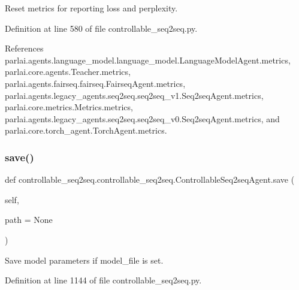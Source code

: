 \begin{DoxyVerb}Reset metrics for reporting loss and perplexity.\end{DoxyVerb}
 

Definition at line 580 of file controllable\+\_\+seq2seq.\+py.



References parlai.\+agents.\+language\+\_\+model.\+language\+\_\+model.\+Language\+Model\+Agent.\+metrics, parlai.\+core.\+agents.\+Teacher.\+metrics, parlai.\+agents.\+fairseq.\+fairseq.\+Fairseq\+Agent.\+metrics, parlai.\+agents.\+legacy\+\_\+agents.\+seq2seq.\+seq2seq\+\_\+v1.\+Seq2seq\+Agent.\+metrics, parlai.\+core.\+metrics.\+Metrics.\+metrics, parlai.\+agents.\+legacy\+\_\+agents.\+seq2seq.\+seq2seq\+\_\+v0.\+Seq2seq\+Agent.\+metrics, and parlai.\+core.\+torch\+\_\+agent.\+Torch\+Agent.\+metrics.

\mbox{\label{classcontrollable__seq2seq_1_1controllable__seq2seq_1_1ControllableSeq2seqAgent_abc818803e27d99525704db33cd4dd928}} 
\subsubsection{\texorpdfstring{save()}{save()}}
{\footnotesize\ttfamily def controllable\+\_\+seq2seq.\+controllable\+\_\+seq2seq.\+Controllable\+Seq2seq\+Agent.\+save (\begin{DoxyParamCaption}\item[{}]{self,  }\item[{}]{path = {\ttfamily None} }\end{DoxyParamCaption})}

\begin{DoxyVerb}Save model parameters if model_file is set.\end{DoxyVerb}
 

Definition at line 1144 of file controllable\+\_\+seq2seq.\+py.



